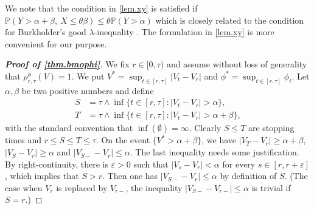 \documentclass[12pt,oneside,reqno,fleqn]{amsart}
\numberwithin{equation}{section}
\theoremstyle{remark}
\newcommand\PP{{\mathbb P}}
\newcommand{\1}{{\mathbf 1}}
\renewcommand{\le}{\leq}
\renewcommand{\ge}{\geq}
\begin{document}
	We note that the condition in \cref{lem.xy} is satisfied if $\PP(Y>\alpha+\beta,\ X\le \theta \beta)\le \theta\PP(Y>\alpha)$ which is closely related to the condition for Burkholder's good $\lambda$-inequality \cite[Lemma 7.1]{MR365692}. The formulation in \cref{lem.xy} is more convenient for our  purpose. 

	\begin{proof}[\bf Proof of \cref{thm.bmophi}]
		We fix $r\in[0,\tau)$ and assume without loss of generality that $\rho^\phi_{r,\tau}(V)=1$.
		We put $V^*=\sup_{t\in[r,\tau]}|V_t- V_{r}|$ and $\phi^*=\sup_{t\in[r,\tau]} \phi_t$.
		Let $\alpha, \beta$ be two positive numbers and define
		\begin{align*}
			S&=\tau\wedge\inf\{t\in[r,\tau]:|V_t- V_{r}|> \alpha\},\\ 
			T&=\tau\wedge\inf\{t\in[r,\tau]:|V_t- V_{r}|> \alpha+\beta\},
		\end{align*}
		with the standard convention that $\inf(\emptyset)=\infty$. Clearly $S\le T$ are stopping times and $r\le S\le T\le \tau$.
		On the event $\{V^*> \alpha+\beta\}$, we have $|V_T- V_{r}|\ge \alpha+\beta$, $|V_S-V_r|\ge \alpha$ and $|V_{S-}- V_{r}|\le \alpha$.
		The last inequality needs some justification. By right-continuity, there is $\varepsilon>0$ such that $|V_{s}-V_r|<\alpha$ for every $s\in[r,r+\varepsilon]$, which implies that $S>r$. Then one has $|V_{S-}-V_{r}|\le \alpha$ by definition of $S$. (The case when $V_{r}$ is replaced by $V_{r-}$, the inequality $|V_{S-}-V_{r-}|\le \alpha$ is trivial if $S=r$.)


\end{proof}
\end{document}
